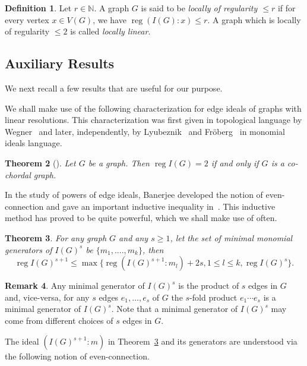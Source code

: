 \documentclass[10pt]{amsart}
\newtheorem{theo}{Theorem}[section]
\theoremstyle{definition}
\newtheorem{defi}[theo]{Definition}
\newtheorem{rema}[theo]{Remark}
\DeclareMathOperator{\reg}{reg}
\newcommand{\NN}{{\mathbb N}}
\begin{document}
\begin{defi} Let $r \in \NN$. A graph $G$ is said to be \emph{locally of regularity $\le r$} if for every vertex $x \in V(G)$, we have $\reg (I(G):x) \le r$. A graph which is locally of regularity $\le 2$ is called \emph{locally linear}.
\end{defi}

\subsection{Auxiliary Results} 
We next recall a few results that are useful for our purpose.

We shall make use of the following characterization for edge ideals of graphs with linear resolutions. This characterization was first given in topological language by Wegner~\cite{Wegner} and later, independently, by Lyubeznik~\cite{L} and Fr\"oberg~\cite{Fr} in monomial ideals language.

\begin{theo}[] \label{thm.regtwo}
Let $G$ be a graph. Then $\reg I(G) = 2$ if and only if $G$ is a co-chordal graph.
\end{theo}


In the study of powers of edge ideals, Banerjee developed the notion of even-connection and gave an important inductive inequality in~\cite{Ba}. This inductive method has proved to be quite powerful, which we shall make use of often.

\begin{theo}\label{thm.inductive}
For any graph $G$ and any $s\geq 1$, let the set of minimal monomial generators of $I(G)^s$ be $\{m_1,....,m_k\}$, then \[
\reg I(G)^{s+1} \leq \max \{ \reg (I(G)^{s+1} : m_l)+2s, 1\leq l \leq k, \reg I(G)^s\}.
\]

\end{theo}

\begin{rema}
Any minimal generator of $I(G)^s$ is the product of $s$ edges in $G$ and, vice-versa, for any $s$ edges $e_1, \ldots, e_s$ of $G$ the $s$-fold product $e_1 \cdots e_s$ is a minimal generator of $I(G)^s$. Note that a minimal generator of $I(G)^s$ may come from different choices of $s$ edges in $G$. 
\end{rema}

 The ideal $(I(G)^{s+1}: m)$ in Theorem~\ref{thm.inductive} and its generators are understood via the following notion of even-connection.
\end{document}
